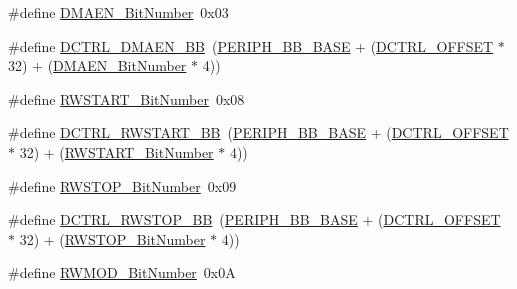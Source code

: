 \begin{DoxyCompactItemize}
\item 
\#define \hyperlink{group___s_d_i_o___private___types_definitions_gab2af311e327213503f0dbf3d013b7944}{D\+M\+A\+E\+N\+\_\+\+Bit\+Number}~0x03
\item 
\#define \hyperlink{group___s_d_i_o___private___types_definitions_ga43f7336d4f955c6cf1f676ccbc043fe9}{D\+C\+T\+R\+L\+\_\+\+D\+M\+A\+E\+N\+\_\+\+BB}~(\hyperlink{group___peripheral__memory__map_gaed7efc100877000845c236ccdc9e144a}{P\+E\+R\+I\+P\+H\+\_\+\+B\+B\+\_\+\+B\+A\+SE} + (\hyperlink{group___s_d_i_o___private___types_definitions_ga948c1382c4cfd3af3e406c4d0cdd4240}{D\+C\+T\+R\+L\+\_\+\+O\+F\+F\+S\+ET} $\ast$ 32) + (\hyperlink{group___s_d_i_o___private___types_definitions_gab2af311e327213503f0dbf3d013b7944}{D\+M\+A\+E\+N\+\_\+\+Bit\+Number} $\ast$ 4))
\item 
\#define \hyperlink{group___s_d_i_o___private___types_definitions_ga773045c51d3e8daee0c181517c44a2df}{R\+W\+S\+T\+A\+R\+T\+\_\+\+Bit\+Number}~0x08
\item 
\#define \hyperlink{group___s_d_i_o___private___types_definitions_gac776c39dfac0e1ed007217133e1145c3}{D\+C\+T\+R\+L\+\_\+\+R\+W\+S\+T\+A\+R\+T\+\_\+\+BB}~(\hyperlink{group___peripheral__memory__map_gaed7efc100877000845c236ccdc9e144a}{P\+E\+R\+I\+P\+H\+\_\+\+B\+B\+\_\+\+B\+A\+SE} + (\hyperlink{group___s_d_i_o___private___types_definitions_ga948c1382c4cfd3af3e406c4d0cdd4240}{D\+C\+T\+R\+L\+\_\+\+O\+F\+F\+S\+ET} $\ast$ 32) + (\hyperlink{group___s_d_i_o___private___types_definitions_ga773045c51d3e8daee0c181517c44a2df}{R\+W\+S\+T\+A\+R\+T\+\_\+\+Bit\+Number} $\ast$ 4))
\item 
\#define \hyperlink{group___s_d_i_o___private___types_definitions_gae8c0654ad5cba23281bcfa77ef19b9cf}{R\+W\+S\+T\+O\+P\+\_\+\+Bit\+Number}~0x09
\item 
\#define \hyperlink{group___s_d_i_o___private___types_definitions_ga678da1db835676b0fb1976cf3408e2d1}{D\+C\+T\+R\+L\+\_\+\+R\+W\+S\+T\+O\+P\+\_\+\+BB}~(\hyperlink{group___peripheral__memory__map_gaed7efc100877000845c236ccdc9e144a}{P\+E\+R\+I\+P\+H\+\_\+\+B\+B\+\_\+\+B\+A\+SE} + (\hyperlink{group___s_d_i_o___private___types_definitions_ga948c1382c4cfd3af3e406c4d0cdd4240}{D\+C\+T\+R\+L\+\_\+\+O\+F\+F\+S\+ET} $\ast$ 32) + (\hyperlink{group___s_d_i_o___private___types_definitions_gae8c0654ad5cba23281bcfa77ef19b9cf}{R\+W\+S\+T\+O\+P\+\_\+\+Bit\+Number} $\ast$ 4))
\item 
\#define \hyperlink{group___s_d_i_o___private___types_definitions_gad7b722671f65e79d1be2899b643278ad}{R\+W\+M\+O\+D\+\_\+\+Bit\+Number}~0x0A
\item 

\end{DoxyCompactItemize}
